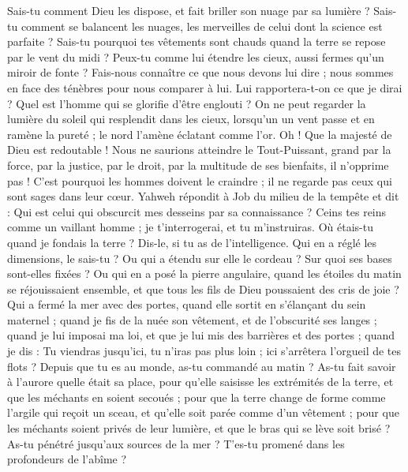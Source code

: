 \begin{multicols}{2}
Sais-tu comment Dieu les dispose, et fait briller son nuage par sa lumière ?
Sais-tu comment se balancent les nuages, les merveilles de celui dont la science est parfaite ?
Sais-tu pourquoi tes vêtements sont chauds quand la terre se repose par le vent du midi ?
Peux-tu comme lui étendre les cieux, aussi fermes qu'un miroir de fonte ?
Fais-nous connaître ce que nous devons lui dire ; nous sommes en face des ténèbres pour nous comparer à lui.
Lui rapportera-t-on ce que je dirai ? Quel est l'homme qui se glorifie d'être englouti ?
On ne peut regarder la lumière du soleil qui resplendit dans les cieux, lorsqu'un un vent passe et en ramène la pureté ;
le nord l'amène éclatant comme l'or. Oh ! Que la majesté de Dieu est redoutable !
Nous ne saurions atteindre le Tout-Puissant, grand par la force, par la justice, par le droit, par la multitude de ses bienfaits, il n'opprime pas !
C'est pourquoi les hommes doivent le craindre ; il ne regarde pas ceux qui sont sages dans leur cœur.
\VerseOne{}Yahweh répondit à Job du milieu de la tempête et dit :
Qui est celui qui obscurcit mes desseins par sa connaissance ?
Ceins tes reins comme un vaillant homme ; je t'interrogerai, et tu m'instruiras.
Où étais-tu quand je fondais la terre ? Dis-le, si tu as de l'intelligence.
Qui en a réglé les dimensions, le sais-tu ? Ou qui a étendu sur elle le cordeau ?
Sur quoi ses bases sont-elles fixées ? Ou qui en a posé la pierre angulaire,
quand les étoiles du matin se réjouissaient ensemble, et que tous les fils de Dieu poussaient des cris de joie ?
Qui a fermé la mer avec des portes, quand elle sortit en s'élançant du sein maternel ;
quand je fis de la nuée son vêtement, et de l'obscurité ses langes ;
quand je lui imposai ma loi, et que je lui mis des barrières et des portes ;
quand je dis : Tu viendras jusqu'ici, tu n'iras pas plus loin ; ici s'arrêtera l'orgueil de tes flots ?
Depuis que tu es au monde, as-tu commandé au matin ? As-tu fait savoir à l'aurore quelle était sa place,
pour qu'elle saisisse les extrémités de la terre, et que les méchants en soient secoués ;
pour que la terre change de forme comme l'argile qui reçoit un sceau, et qu'elle soit parée comme d'un vêtement ;
pour que les méchants soient privés de leur lumière, et que le bras qui se lève soit brisé ?
As-tu pénétré jusqu'aux sources de la mer ? T'es-tu promené dans les profondeurs de l'abîme ?

\end{multicols}
